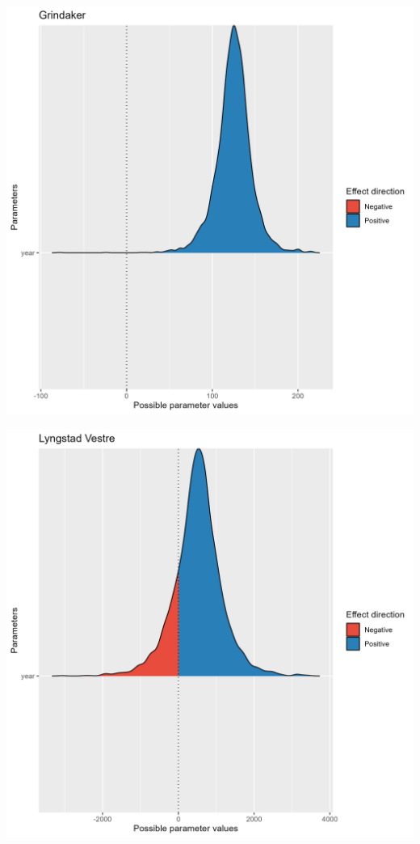 \documentclass[
  letterpaper,
  DIV=11,
  numbers=noendperiod]{scrreport}
\begin{document}
\includegraphics{data/derived_data/direction_plots/plots/Grindaker.png}

\includegraphics{data/derived_data/direction_plots/plots/Lyngstad Vestre.png}
\end{document}
